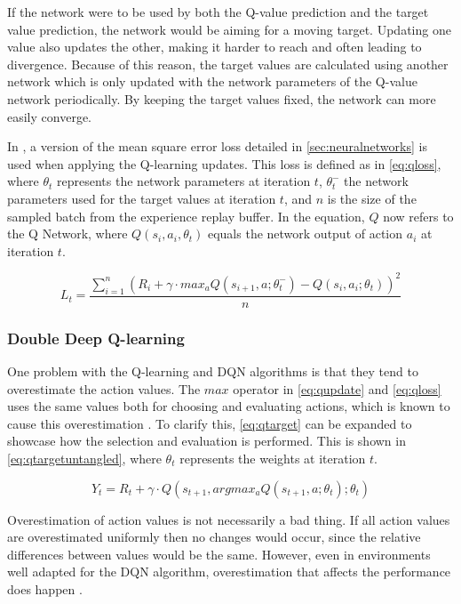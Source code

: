 \documentclass{kththesis}
\begin{document}
If the network were to be used by both the Q-value prediction and the target value prediction, the network would be aiming for a moving target. Updating one value also updates the other, making it harder to reach and often leading to divergence. Because of this reason, the target values are calculated using another network which is only updated with the network parameters of the Q-value network periodically. By keeping the target values fixed, the network can more easily converge. \parencite{mnih2015human}

In \parencite{mnih2015human}, a version of the mean square error loss detailed in \autoref{sec:neuralnetworks} is used when applying the Q-learning updates. This loss is defined as in \autoref{eq:qloss}, where $\theta_t$ represents the network parameters at iteration $t$, $\theta_t^-$ the network parameters used for the target values at iteration $t$, and $n$ is the size of the sampled batch from the experience replay buffer. In the equation, $Q$ now refers to the Q Network, where $Q(s_i, a_i, \theta_t)$ equals the network output of action $a_i$ at iteration $t$.

\begin{equation}
\label{eq:qloss}
L_t = \frac{\sum_{i=1}^n (R_i + \gamma \cdot max_a Q(s_{i+1}, a;\theta_t^-) - Q(s_i, a_i;\theta_t))^2}{n}
\end{equation}

\subsubsection{Double Deep Q-learning}
One problem with the Q-learning and DQN algorithms is that they tend to overestimate the action values. The $max$ operator in \autoref{eq:qupdate} and \autoref{eq:qloss} uses the same values both for choosing and evaluating actions, which is known to cause this overestimation \parencite{van2016deep}. To clarify this, \autoref{eq:qtarget} can be expanded to showcase how the selection and evaluation is performed. This is shown in \autoref{eq:qtargetuntangled}, where $\theta_t$ represents the weights at iteration $t$.

\begin{equation}
\label{eq:qtargetuntangled}
Y_t = R_t + \gamma \cdot Q(s_{t+1}, argmax_aQ(s_{t+1}, a;\theta_t);\theta_t)
\end{equation}

Overestimation of action values is not necessarily a bad thing. If all action values are overestimated uniformly then no changes would occur, since the relative differences between values would be the same. However, even in environments well adapted for the DQN algorithm, overestimation that affects the performance does happen \parencite{van2016deep}.
\end{document}
